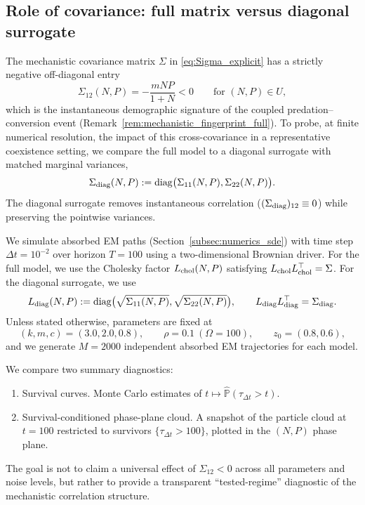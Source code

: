 \documentclass[pdflatex,sn-mathphys-ay]{sn-jnl}
\theoremstyle{thmstyleone}
\theoremstyle{definition}
\theoremstyle{remark}
\begin{document}
\subsection{Role of covariance: full matrix versus diagonal surrogate}
\label{subsec:numerics_covariance_role_A}

The mechanistic covariance matrix $\Sigma$ in \eqref{eq:Sigma_explicit} has a strictly negative off-diagonal entry
\[
\Sigma_{12}(N,P)=-\frac{mNP}{1+N}<0\qquad \text{for }(N,P)\in U,
\]
which is the instantaneous demographic signature of the coupled predation--conversion event
(Remark~\ref{rem:mechanistic_fingerprint_full}). To probe, at finite numerical resolution, the impact of this
cross-covariance in a representative coexistence setting, we compare the full model to a diagonal surrogate with
matched marginal variances,
\begin{equation}\label{eq:Sigma_diag_rewrite}
\Sigma_{\rm diag}(N,P):=\operatorname{diag}\bigl(\Sigma_{11}(N,P),\Sigma_{22}(N,P)\bigr).
\end{equation}
The diagonal surrogate removes instantaneous correlation ($(\Sigma_{\rm diag})_{12}\equiv 0$) while preserving the pointwise
variances.

We simulate absorbed EM paths (Section~\ref{subsec:numerics_sde}) with time step $\Delta t=10^{-2}$
over horizon $T=100$ using a two-dimensional Brownian driver.
For the full model, we use the Cholesky factor $L_{\rm chol}(N,P)$ satisfying
$L_{\rm chol}L_{\rm chol}^\top=\Sigma$.
For the diagonal surrogate, we use
\[
L_{\rm diag}(N,P):=\operatorname{diag}\bigl(\sqrt{\Sigma_{11}(N,P)},\sqrt{\Sigma_{22}(N,P)}\bigr),
\qquad
L_{\rm diag}L_{\rm diag}^\top=\Sigma_{\rm diag}.
\]
Unless stated otherwise, parameters are fixed at
\[
(k,m,c)=(3.0,2.0,0.8),\qquad \rho=0.1\ (\Omega=100),\qquad z_0=(0.8,0.6),
\]
and we generate $M=2000$ independent absorbed EM trajectories for each model.

We compare two summary diagnostics:
\begin{enumerate}[label=(\roman*)]
\item Survival curves. Monte Carlo estimates of $t\mapsto \widehat{\mathbb{P}}(\tau_{\Delta t}>t)$.
\item Survival-conditioned phase-plane cloud. A snapshot of the particle cloud at $t=100$ restricted to
survivors $\{\tau_{\Delta t}>100\}$, plotted in the $(N,P)$ phase plane.
\end{enumerate}
The goal is not to claim a universal effect of $\Sigma_{12}<0$ across all parameters and noise levels, but rather to provide a transparent ``tested-regime'' diagnostic of the mechanistic correlation structure.
\end{document}

